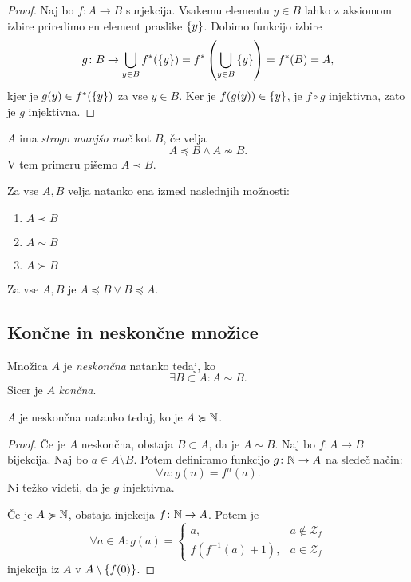 \documentclass[12pt, a4paper]{article}
\begin{document}
\begin{proof}
Naj bo $f\colon A\to B$ surjekcija. Vsakemu elementu $y\in B$ lahko z aksiomom izbire priredimo en element praslike $\left\{y\right\}$. Dobimo funkcijo izbire
\[
g\colon B\to\bigcup_{y\in B}f^*(\left\{y\right\})=f^*\left(\bigcup_{y\in B}\left\{y\right\}\right)=f^*(B)=A,
\]
kjer je $g(y)\in f^*(\left\{y\right\})$ za vse $y\in B$. Ker je $f(g(y))\in\left\{y\right\}$, je $f\circ g$ injektivna, zato je $g$ injektivna.
\end{proof}

\begin{definicija}
$A$ ima \emph{strogo manjšo moč} kot $B$, če velja
\[
A\preccurlyeq B\land A\not\sim B.
\]
V tem primeru pišemo $A\prec B$.
\end{definicija}

\begin{izrek}[O trihotomiji]
Za vse $A,B$ velja natanko ena izmed naslednjih možnosti:

\begin{enumerate}
\item $A\prec B$
\item $A\sim B$
\item $A\succ B$
\end{enumerate}
\end{izrek}

\begin{posledica}
Za vse $A,B$ je $A\preccurlyeq B\lor B\preccurlyeq A$.
\end{posledica}

\newpage

\subsection{Končne in neskončne množice}

\begin{okvir}
\begin{definicija}[Dedekind]
Množica $A$ je \emph{neskončna} natanko tedaj, ko
\[
\exists B\subset A\colon A\sim B.
\]
Sicer je $A$ \emph{končna}.	
\end{definicija}
\end{okvir}

\begin{izrek}
$A$ je neskončna natanko  tedaj, ko je $A\succcurlyeq\mathbb{N}$.
\end{izrek}

\begin{proof}
Če je $A$ neskončna, obstaja $B\subset A$, da je $A\sim B$. Naj bo $f\colon A\to B$ bijekcija. Naj bo $a\in A\setminus B$. Potem definiramo funkcijo $g\colon \mathbb{N}\to A$ na sledeč način:
\[
\forall n\colon g(n)=f^n(a).
\]
Ni težko videti, da je $g$ injektivna.

Če je $A\succcurlyeq\mathbb{N}$, obstaja injekcija $f\colon\mathbb{N}\to A$. Potem je
\[
\forall a\in A\colon g(a)=\begin{cases}
a, &a\not\in\mathcal{Z}_f
\\
f\left(f^{-1}(a)+1\right), &a\in\mathcal{Z}_f
\end{cases}
\]
injekcija iz $A$ v $A\setminus\left\{f(0)\right\}$.
\end{proof}
\end{document}
